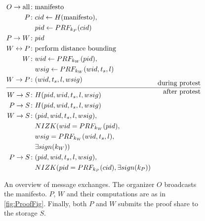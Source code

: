 \begin{columns}[t]
\begin{column}{0.32\linewidth}
    \begin{figure}
      \centering
      \begin{minipage}{\linewidth}
        \begin{align*}
          O\to \text{all}\colon & \text{manifesto} \\
          P\colon & cid\gets H(\text{manifesto}), \\
          & pid\gets PRF_{k_P}(cid) \\
          P\to W\colon & pid \\
          W\leftrightarrow P\colon & \text{perform distance bounding} \\
          W\colon & wid\gets PRF_{k_W}(pid), \\
          & wsig\gets PRF_{k_W}(wid, t_s, l) \\
          W\to P\colon & (wid, t_s, l, wsig) \\[-1em]
          && \text{during protest} \\ \hline && \text{after protest} \\[-1em]
          W\to S\colon & H(pid, wid, t_s, l, wsig) \\
          P\to S\colon & H(pid, wid, t_s, l, wsig) \\
          W\to S\colon & (pid, wid, t_s, l, wsig),\\
            & NIZK( wid = PRF_{k_W}(pid), \\
            & wsig = PRF_{k_W}(wid, t_s, l), \\
            & \exists sign(k_W)) \\
          P\to S\colon & (pid, wid, t_s, l, wsig),\\
          & NIZK(pid = PRF_{k_P}(cid), \exists sign(k_P))
        \end{align*}
      \end{minipage}
      \caption{%
        An overview of message exchanges.
        The organizer \(O\) broadcasts the manifesto.
        \(P\), \(W\) and their computations are as in \cref{fig:ProofFig}.
        Finally, both \(P\) and \(W\) submits the proof share to the storage \(S\).
      }%
      \label{Protocol}
    \end{figure}

    \printbibliography[heading=none]

  \end{column}

  \hfill

  \begin{column}{0.32\linewidth}


\end{column}
\end{columns}
